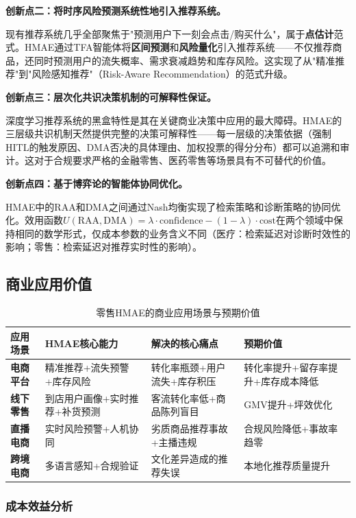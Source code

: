 \documentclass[11pt,a4paper]{ctexart}
\theoremstyle{remark}
\begin{document}
\textbf{创新点二：将时序风险预测系统性地引入推荐系统。}

现有推荐系统几乎全部聚焦于"预测用户下一刻会点击/购买什么"，属于\textbf{点估计}范式。HMAE通过TFA智能体将\textbf{区间预测}和\textbf{风险量化}引入推荐系统——不仅推荐商品，还同时预测用户的流失概率、需求衰减趋势和库存风险。这实现了从"精准推荐"到"风险感知推荐"（Risk-Aware Recommendation）的范式升级。

\textbf{创新点三：层次化共识决策机制的可解释性保证。}

深度学习推荐系统的黑盒特性是其在关键商业决策中应用的最大障碍。HMAE的三层级共识机制天然提供完整的决策可解释性——每一层级的决策依据（强制HITL的触发原因、DMA否决的具体理由、加权投票的得分分布）都可以追溯和审计。这对于合规要求严格的金融零售、医药零售等场景具有不可替代的价值。

\textbf{创新点四：基于博弈论的智能体协同优化。}

HMAE中的RAA和DMA之间通过Nash均衡实现了检索策略和诊断策略的协同优化。效用函数$U(\text{RAA}, \text{DMA}) = \lambda \cdot \text{confidence} - (1-\lambda) \cdot \text{cost}$在两个领域中保持相同的数学形式，仅成本参数的业务含义不同（医疗：检索延迟对诊断时效性的影响；零售：检索延迟对推荐实时性的影响）。

\subsection{商业应用价值}

\begin{table}[H]
\centering
\caption{零售HMAE的商业应用场景与预期价值}
\begin{tabular}{p{2.5cm}|p{4cm}|p{4.5cm}|p{3cm}}
\toprule
\textbf{应用场景} & \textbf{HMAE核心能力} & \textbf{解决的核心痛点} & \textbf{预期价值} \\
\midrule
\textbf{电商平台} & 精准推荐+流失预警+库存风险 & 转化率瓶颈+用户流失+库存积压 & 转化率提升+留存率提升+库存成本降低 \\
\midrule
\textbf{线下零售} & 到店用户画像+实时推荐+补货预测 & 客流转化率低+商品陈列盲目 & GMV提升+坪效优化 \\
\midrule
\textbf{直播电商} & 实时风险预警+人机协同 & 劣质商品推荐事故+主播违规 & 合规风险降低+事故率趋零 \\
\midrule
\textbf{跨境电商} & 多语言感知+合规验证 & 文化差异造成的推荐失误 & 本地化推荐质量提升 \\
\bottomrule
\end{tabular}
\end{table}

\subsubsection{成本效益分析}
\end{document}

